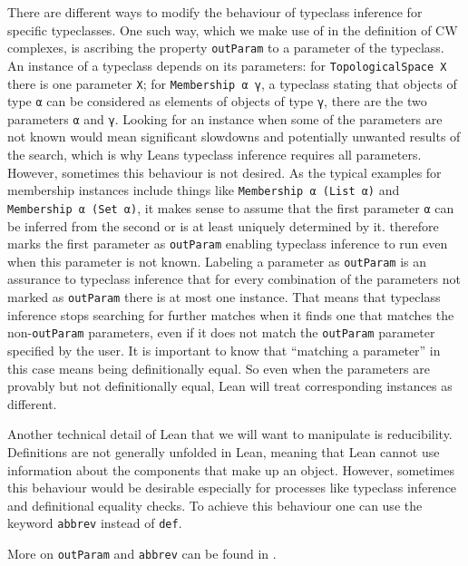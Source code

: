 There are different ways to modify the behaviour of typeclass inference for specific typeclasses. 
One such way, which we make use of in the definition of CW complexes, is ascribing the property \lstinline|outParam| to a parameter of the typeclass. 
An instance of a typeclass depends on its parameters: for \lstinline|TopologicalSpace X| there is one parameter \lstinline|X|; for \lstinline|Membership α γ|, a typeclass stating that objects of type \lstinline|α| can be considered as elements of objects of type \lstinline|γ|, there are the two parameters \lstinline|α| and \lstinline|γ|.
Looking for an instance when some of the parameters are not known would mean significant slowdowns and potentially unwanted results of the search, which is why Leans typeclass inference requires all parameters. 
However, sometimes this behaviour is not desired. 
As the typical examples for membership instances include things like \lstinline|Membership α (List α)| and \lstinline|Membership α (Set α)|, it makes sense to assume that the first parameter \lstinline|α| can be inferred from the second or is at least uniquely determined by it. 
\mathlib therefore marks the first parameter as \lstinline|outParam| enabling typeclass inference to run even when this parameter is not known.
Labeling a parameter as \lstinline|outParam| is an assurance to typeclass inference that for every combination of the parameters not marked as \lstinline|outParam| there is at most one instance. 
That means that typeclass inference stops searching for further matches when it finds one that matches the non-\lstinline|outParam| parameters, even if it does not match the \lstinline|outParam| parameter specified by the user. 
It is important to know that ``matching a parameter'' in this case means being definitionally equal. 
So even when the parameters are provably but not definitionally equal, Lean will treat corresponding instances as different. 

Another technical detail of Lean that we will want to manipulate is reducibility.
Definitions are not generally unfolded in Lean, meaning that Lean cannot use information about the components that make up an object. 
However, sometimes this behaviour would be desirable especially for processes like typeclass inference and definitional equality checks. 
To achieve this behaviour one can use the keyword \lstinline|abbrev| instead of \lstinline|def|. 

More on \lstinline|outParam| and \lstinline|abbrev| can be found in \cite{LeanReference2025}.


